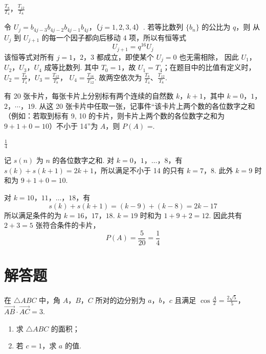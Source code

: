 \begin{answer}
\(\frac{T_{8}}{T_{4}}\)，\(\frac{T_{12}}{T_{8}}\)
\end{answer}

\begin{solution}
令
\(U_j=b_{4j-3}b_{4j-2}b_{4j-1}b_{4j}\)，（\(j=1,2,3,4\)）.
若等比数列 \(\{b_n\}\) 的公比为 \(q\)，则
从 \(U_j\) 到 \(U_{j+1}\) 的每一个因子都向后移动 4 项，所以有恒等式
\[
U_{j+1}=q^{16}U_j
\]
该恒等式对所有 \(j=1\)，\(2\)，\(3\) 都成立，即使某个 \(U_j=0\) 也无需相除，
因此 \(U_1\)，\(U_2\)，\(U_3\)，\(U_4\) 成等比数列. 其中 \(T_0=1\)，故
\(U_1=T_4\)；在题目中的比值有定义时，
\(U_2=\frac{T_8}{T_4}\)，\(U_3=\frac{T_{12}}{T_8}\)，
\(U_4=\frac{T_{16}}{T_{12}}\).
故两空依次为 \(\frac{T_8}{T_4}\)、\(\frac{T_{12}}{T_8}\).
\end{solution}

\begin{problem}
有 20 张卡片，每张卡片上分别标有两个连续的自然数 \(k\)，\(k + 1\)，其中 \(k = 0\)，\(1\)，\(2\)，\(\cdots\)，\(19\). 从这 20 张卡片中任取一张，记事件“该卡片上两个数的各位数字之和（例如：若取到标有 9, 10 的卡片，则卡片上两个数的各位数字之和为 \(9 + 1 + 0 = 10\)）不小于 14”为 \(A\)，则 \(P(A)\) =\fillinblank{}.
\end{problem}

\begin{answer}
\(\frac{1}{4}\)
\end{answer}

\begin{solution}
记 \(s(n)\) 为 \(n\) 的各位数字之和. 对 \(k=0\)，\(1\)，\(\ldots\)，\(8\)，有
\(s(k)+s(k+1)=2k+1\)，所以满足不小于 14 的只有 \(k=7\)，\(8\).
此外 \(k=9\) 时和为 \(9+1+0=10\).

对 \(k=10\)，\(11\)，\(\ldots\)，\(18\)，有
\[
s(k)+s(k+1)=(k-9)+(k-8)=2k-17
\]
所以满足条件的为 \(k=16\)，\(17\)，\(18\). \(k=19\) 时和为
\(1+9+2=12\). 因此共有 \(2+3=5\) 张符合条件的卡片，
\[
P(A)=\frac5{20}=\frac14
\]
\end{solution}

\section{解答题}

\begin{problem}
在 \(\triangle ABC\) 中，角 \(A\)，\(B\)，\(C\) 所对的边分别为 \(a\)，\(b\)，\(c\) 且满足 \(\cos \frac{A}{2} = \frac{2\sqrt{5}}{5}\)，\(\overrightarrow{AB} \cdot \overrightarrow{AC} = 3\).
\begin{enumerate}
\item 求 \( \triangle ABC \) 的面积；
\item 若 \(c = 1\)，求 \(a\) 的值.
\end{enumerate}
\end{problem}

